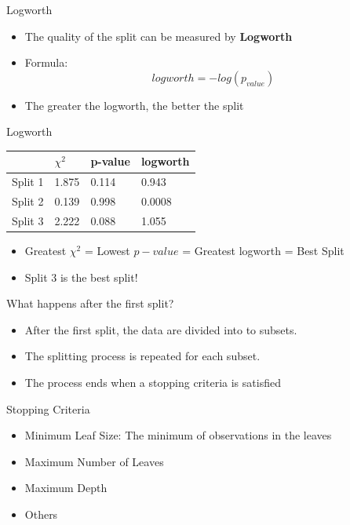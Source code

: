 \documentclass[
  ignorenonframetext,
]{beamer}
\providecommand{\tightlist}{%
  \setlength{\itemsep}{0pt}\setlength{\parskip}{0pt}}
\begin{document}
\begin{frame}{Logworth}
\protect\hypertarget{logworth}{}

\begin{itemize}
\item
  The quality of the split can be measured by \textbf{Logworth}
\item
  Formula: \[
  logworth = -log(p_{value})
  \]
\item
  The greater the logworth, the better the split
\end{itemize}

\end{frame}

\begin{frame}{Logworth}
\protect\hypertarget{logworth-1}{}

\begin{longtable}[]{@{}llll@{}}
\toprule
& \(\chi^2\) & p-value & logworth\tabularnewline
\midrule
\endhead
Split 1 & 1.875 & 0.114 & 0.943\tabularnewline
Split 2 & 0.139 & 0.998 & 0.0008\tabularnewline
Split 3 & 2.222 & 0.088 & 1.055\tabularnewline
\bottomrule
\end{longtable}

\begin{itemize}
\item
  Greatest \(\chi^2\) = Lowest \(p-value\) = Greatest logworth = Best
  Split
\item
  Split 3 is the best split!
\end{itemize}

\end{frame}

\begin{frame}{What happens after the first split?}
\protect\hypertarget{what-happens-after-the-first-split}{}

\begin{itemize}
\tightlist
\item
  After the first split, the data are divided into to subsets.
\item
  The splitting process is repeated for each subset.
\item
  The process ends when a stopping criteria is satisfied
\end{itemize}

\end{frame}

\begin{frame}{Stopping Criteria}
\protect\hypertarget{stopping-criteria}{}

\begin{itemize}
\tightlist
\item
  Minimum Leaf Size: The minimum of observations in the leaves
\item
  Maximum Number of Leaves
\item
  Maximum Depth
\item
  Others
\end{itemize}

\end{frame}
\end{document}

